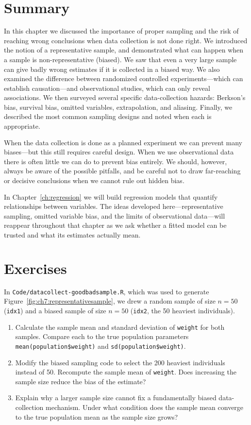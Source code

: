 \section{Summary}
In this chapter we discussed the importance of proper sampling and the risk of
reaching wrong conclusions when data collection is not done right. We introduced
the notion of a representative sample, and demonstrated what can happen when a
sample is non-representative (biased). We saw that even a very large sample can
give badly wrong estimates if it is collected in a biased way. We also examined
the difference between randomized controlled experiments---which can establish
causation---and observational studies, which can only reveal associations. We
then surveyed several specific data-collection hazards: Berkson's bias, survival
bias, omitted variables, extrapolation, and aliasing. Finally, we described the
most common sampling designs and noted when each is appropriate.

When the data collection is done as a planned experiment we can prevent many
biases---but this still requires careful design. When we use observational data
there is often little we can do to prevent bias entirely. We should, however,
always be aware of the possible pitfalls, and be careful not to draw
far-reaching or decisive conclusions when we cannot rule out hidden bias.

In Chapter~\ref{ch:regression} we will build regression models that quantify
relationships between variables. The ideas developed here---representative
sampling, omitted variable bias, and the limits of observational data---will
reappear throughout that chapter as we ask whether a fitted model can be
trusted and what its estimates actually mean.

\section{Exercises}

\begin{exercise}
  In \lstinline{Code/datacollect-goodbadsample.R}, which was used to generate
  Figure~\ref{fig:ch7:representativesample}, we drew a random sample of size
  $n = 50$ (\lstinline{idx1}) and a biased sample of size $n = 50$
  (\lstinline{idx2}, the 50 heaviest individuals).
  \begin{enumerate}
  \item Calculate the sample mean and standard deviation of \lstinline{weight}
    for both samples. Compare each to the true population parameters
    \lstinline{mean(population$weight)} and \lstinline{sd(population$weight)}.
  \item Modify the biased sampling code to select the 200 heaviest individuals
    instead of 50. Recompute the sample mean of \lstinline{weight}. Does
    increasing the sample size reduce the bias of the estimate?
  \item Explain why a larger sample size cannot fix a fundamentally biased
    data-collection mechanism. Under what condition does the sample mean
    converge to the true population mean as the sample size grows?
  \end{enumerate}
\end{exercise}

